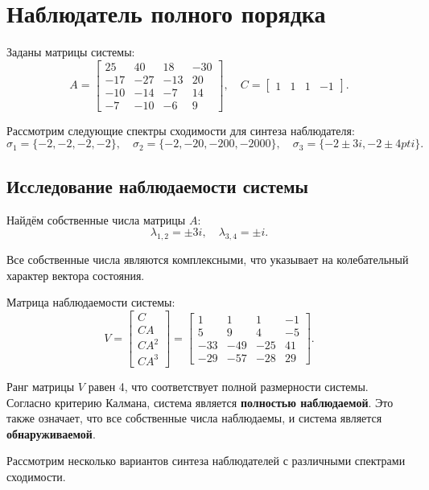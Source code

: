 \section{Наблюдатель полного порядка}

Заданы матрицы системы:
\[
A = \begin{bmatrix}
    25 & 40 & 18 & -30 \\
    -17 & -27 & -13 & 20 \\
    -10 & -14 & -7 & 14 \\
    -7 & -10 & -6 & 9
\end{bmatrix}, \quad
C = \begin{bmatrix}
    1 & 1 & 1 & -1
\end{bmatrix}.
\]

Рассмотрим следующие спектры сходимости для синтеза наблюдателя:
\[
    \sigma_1 = \{-2, -2, -2, -2\}, \quad
    \sigma_2 = \{-2, -20, -200, -2000\}, \quad
    \sigma_3 = \{-2 \pm 3i, -2 \pm 4pti\}.
\]

\subsection{Исследование наблюдаемости системы}

Найдём собственные числа матрицы $A$:
\[
    \lambda_{1,2} = \pm 3i, \quad \lambda_{3,4} = \pm i.
\]

Все собственные числа являются комплексными, что указывает на колебательный характер вектора состояния.

Матрица наблюдаемости системы:
\[
V = \begin{bmatrix}
    C \\
    CA \\
    CA^2 \\
    CA^3
\end{bmatrix} =
\begin{bmatrix}
    1 & 1 & 1 & -1 \\
    5 & 9 & 4 & -5 \\
    -33 & -49 & -25 & 41 \\
    -29 & -57 & -28 & 29
\end{bmatrix}.
\]

Ранг матрицы $V$ равен 4, что соответствует полной размерности системы. Согласно критерию Калмана, система является \textbf{полностью наблюдаемой}. Это также означает, что все собственные числа наблюдаемы, и система является \textbf{обнаруживаемой}.

Рассмотрим несколько вариантов синтеза наблюдателей с различными спектрами сходимости.


